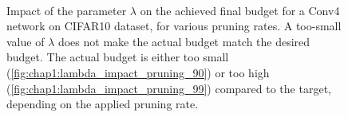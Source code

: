 \begin{figure}
  \centering
  \\
  \caption{ Impact of the parameter $\lambda$ on the achieved final
    budget for a Conv4 network on CIFAR10 dataset, for various pruning rates. A
    too-small value of $\lambda$ does not make the actual budget match the desired
    budget. The actual budget is either too small
    (\cref{fig:chap1:lambda_impact_pruning_90}) or too high
    (\cref{fig:chap1:lambda_impact_pruning_99}) compared to the target, depending
    on the applied pruning rate.}
  \label{fig:chap1:lambda_impact}
\end{figure}


